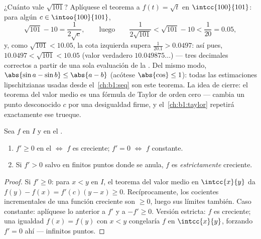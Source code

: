 \begin{example}\label{ex:b1:derivative:mvtestimate}
¿Cuánto vale $\sqrt{101}$? Aplíquese el teorema a $f(t) = \sqrt t$ en
$\intcc{100}{101}$: para algún $c \in \intoo{100}{101}$,
\[
\sqrt{101} - 10 = \frac{1}{2\sqrt c},
\qquad\text{luego}\qquad
\frac{1}{2\sqrt{101}} < \sqrt{101} - 10 < \frac{1}{20} = 0.05 ,
\]
y, como $\sqrt{101} < 10.05$, la cota izquierda supera
$\frac{1}{20.1} > 0.0497$: así pues,
$10.0497 < \sqrt{101} < 10.05$ (valor verdadero $10.049875\dots$) ---
tres decimales correctos a partir de una sola evaluación de la
. Del mismo modo,
$\abs{\sin a - \sin b} \leq \abs{a - b}$ (acótese $\abs{\cos}\leq 1$):
todas las estimaciones lipschitzianas usadas desde
el~\cref{ch:b1:seq} son este teorema. La idea de cierre: el teorema
del valor medio es una fórmula de Taylor de orden cero --- cambia un
punto desconocido $c$ por una desigualdad firme, y el~\cref{ch:b1:taylor}
repetirá exactamente ese trueque.
\end{example}

\begin{corollary}\label{cor:b1:derivative:monotone}
Sea $f$  en $I$ y  en el .
\begin{enumerate}
  \item $f' \geq 0$ en el  $\iff$ $f$ es creciente; $f' = 0$
        $\iff$ $f$ constante.
  \item Si $f' > 0$ salvo en finitos puntos donde se anula, $f$ es
        \emph{estrictamente} creciente.
\end{enumerate}
\end{corollary}

\begin{proof}
Si $f' \geq 0$: para $x < y$ en $I$, el teorema del valor medio en
$\intcc{x}{y}$ da $f(y) - f(x) = f'(c)(y - x) \geq 0$.
Recíprocamente, los cocientes incrementales de una función creciente
son $\geq 0$, luego sus límites también. Caso constante: aplíquese lo
anterior a $f'$ y a $-f' \geq 0$. Versión estricta: $f$ es creciente;
una igualdad $f(x) = f(y)$ con $x < y$ congelaría $f$ en
$\intcc{x}{y}$, forzando $f' = 0$ ahí --- infinitos puntos.
\end{proof}


